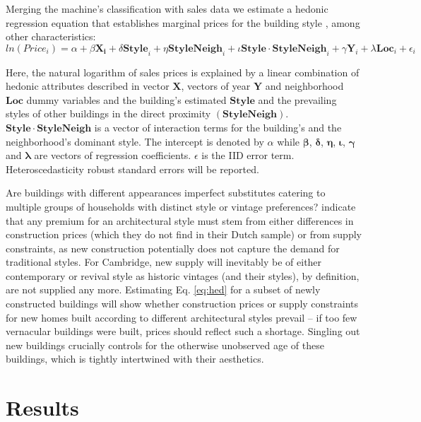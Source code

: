 \documentclass[]{article}
\begin{document}
Merging the machine's classification with sales data
\autocite{LandRegistry2016a} we estimate a hedonic regression equation
that establishes marginal prices for the building style
\autocites[similar
to][]{Moorhouse1994}{Asabere1989}{Vandell1989}{Fuerst2011}{Plaut2006},
among other characteristics: \begin{equation} \label{eq:hed}
  ln(Price_i) = \alpha + \beta\mathbf{X_i} + \delta\mathbf{Style}_i + \eta\mathbf{StyleNeigh}_i + \iota\mathbf{Style\cdot StyleNeigh}_i  +\gamma\mathbf{Y}_i + \lambda\mathbf{Loc}_i +  \epsilon_i
\end{equation}

Here, the natural logarithm of sales prices is explained by a linear
combination of hedonic attributes described in vector \(\mathbf{X}\),
vectors of year \(\mathbf{Y}\) and neighborhood \(\bm{Loc}\) dummy
variables and the building's estimated \(\mathbf{Style}\) and the
prevailing styles of other buildings in the direct proximity
\((\mathbf{StyleNeigh})\). \(\mathbf{Style\cdot StyleNeigh}\) is a
vector of interaction terms for the building's and the neighborhood's
dominant style. The intercept is denoted by \(\alpha\) while
\(\bm{\beta}\), \(\bm{\delta}\), \(\bm{\eta}\), \(\bm{\iota}\),
\(\bm{\gamma}\) and \(\bm{\lambda}\) are vectors of regression
coefficients. \(\epsilon\) is the IID error term. Heteroscedasticity
robust standard errors will be reported.

Are buildings with different appearances imperfect substitutes catering
to multiple groups of households with distinct style or vintage
preferences? \textcite{Buitelaar2017} indicate that any premium for an
architectural style must stem from either differences in construction
prices (which they do not find in their Dutch sample) or from supply
constraints, as new construction potentially does not capture the demand
for traditional styles. For Cambridge, new supply will inevitably be of
either contemporary or revival style as historic vintages (and their
styles), by definition, are not supplied any more. Estimating Eq.
\ref{eq:hed} for a subset of newly constructed buildings will show
whether construction prices or supply constraints for new homes built
according to different architectural styles prevail -- if too few
vernacular buildings were built, prices should reflect such a shortage.
Singling out new buildings crucially controls for the otherwise
unobserved age of these buildings, which is tightly intertwined with
their aesthetics.

\hypertarget{results}{%
\section{Results}\label{results}}
\end{document}
